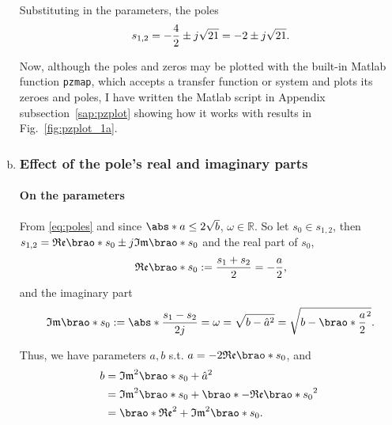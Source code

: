 \documentclass[12pt]{article}
\DeclarePairedDelimiter\brao()%
\DeclarePairedDelimiter\abs||
\begin{document}
\begin{enumerate}[(a)]
        Substituting in the parameters, the poles
        \begin{equation}
            s_{1,2} = -\frac42 \pm j\sqrt{21} = -2 \pm j\sqrt{21}\rlap.
        \end{equation}

        Now, although the poles and zeros may be plotted with the built-in Matlab function \texttt{pzmap}, which accepts a transfer function or system and plots its zeroes and poles,
        I have written the Matlab script in Appendix subsection~\ref{sap:pzplot} showing how it works with results in Fig.~\ref{fig:pzplot_1a}.

    \item
        \subsubsection{Effect of the pole's real and imaginary parts}
        \paragraph{On the parameters}
        From \eqref{eq:poles} and since $\abs*{a} \leq 2\sqrt{b}$, $\omega\in\mathbb{R}$. So let $s_0\in s_{1,2}$, then $s_{1,2} = \mathfrak{Re}\brao*{s_0} \pm j\mathfrak{Im}\brao*{s_0}$ and
        the real part of $s_0$,
        \begin{equation}
            \mathfrak{Re}\brao*{s_0} := \frac{s_1 + s_2}2
            = -\frac{a}2\rlap,
        \end{equation}
        and the imaginary part
        \begin{equation}
            \mathfrak{Im}\brao*{s_0} := \abs*{\frac{s_1 - s_2}{2j}} = \omega = \sqrt{b - \hat{a}^2} = \sqrt{b - \brao*{\frac{a}2}^2}\rlap.
        \end{equation}

        Thus, we have parameters $a,b$ s.t. $a = -2 \mathfrak{Re}\brao*{s_0}$, and
        \begin{equation}
            \begin{aligned}
                b &{}= \mathfrak{Im}^2\brao*{s_0} + \hat{a}^2
            \\*
                & {}= \mathfrak{Im}^2\brao*{s_0} + \brao*{-\mathfrak{Re}\brao*{s_0}}^2
            \\*
                & {}= \brao*{\mathfrak{Re}^2 + \mathfrak{Im}^2}\brao*{s_0}.
            \\*
            \end{aligned}
        \end{equation}


\end{enumerate}
\end{document}

